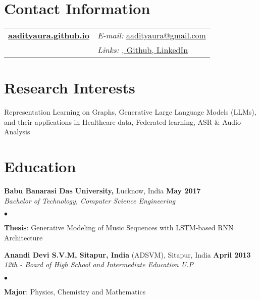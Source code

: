 \documentclass[margin,line]{res}
\newenvironment{list2}{
  \begin{list}{$\bullet$}{%
      \setlength{\itemsep}{0in}
      \setlength{\parsep}{0in} \setlength{\parskip}{0in}
      \setlength{\topsep}{0in} \setlength{\partopsep}{0in} 
      \setlength{\leftmargin}{0.2in}}}{\end{list}}
\begin{document}

\begin{resume}
\section{\sc Contact Information}
\vspace{.05in}
\begin{tabular}{@{}p{3in}p{4in}}
\href{https://aadityaura.github.io}{\bf aadityaura.github.io} & {\it E-mail:}  \href{mailto:aadityaura@gmail.com }{aadityaura@gmail.com } \\
 & {\it Links:} \href{https://scholar.google.com/citations?user=MXqo0_UAAAAJ&hl=en}{\color{blue}{ Google Scholar}, \href{https://github.com/monk1337/} {Github}, \href{https://www.linkedin.com/in/aadityaura/}{LinkedIn}}\\
\end{tabular}


\section{\sc Research Interests}
Representation Learning on Graphs, Generative Large Language Models (LLMs), and their applications in Healthcare data, Federated learning, ASR \& Audio Analysis

\section{\sc Education}
{\bf Babu Banarasi Das University,} Lucknow, India \hfill {\bf {May 2017}}\\
{\em Bachelor of Technology, Computer Science Engineering }
\vspace*{.3cm}
\begin{list2}
\item {\bf Thesis}: Generative Modeling of Music Sequences with LSTM-based RNN Architecture

\end{list2}
{\bf Anandi Devi S.V.M, Sitapur, India} (ADSVM), Sitapur, India \hfill {\bf {April 2013}}\\
{\em 12th - Board of High School and Intermediate Education U.P }
\vspace*{.3cm}
\begin{list2}
\item {\bf Major}: Physics, Chemistry and Mathematics
\end{list2}


\end{resume}
\end{document}
